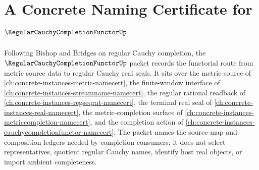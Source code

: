 \chapter{A Concrete Naming Certificate for $\RegularCauchyCompletionFunctorUp$}
\label{ch:concrete-instances-regular-cauchy-completion-functor-namecert}

Following Bishop and Bridges on regular Cauchy completion, the $\RegularCauchyCompletionFunctorUp$ packet records the functorial route from metric source data to regular Cauchy real seals. It sits over the metric source of \autoref{ch:concrete-instances-metric-namecert}, the finite-window interface of \autoref{ch:concrete-instances-streamname-namecert}, the regular rational readback of \autoref{ch:concrete-instances-regseqrat-namecert}, the terminal real seal of \autoref{ch:concrete-instances-real-namecert}, the metric-completion surface of \autoref{ch:concrete-instances-metriccompletion-namecert}, and the completion action of \autoref{ch:concrete-instances-cauchycompletionfunctor-namecert}. The packet names the source-map and composition ledgers needed by completion consumers; it does not select representatives, quotient regular Cauchy names, identify host real objects, or import ambient completeness.

